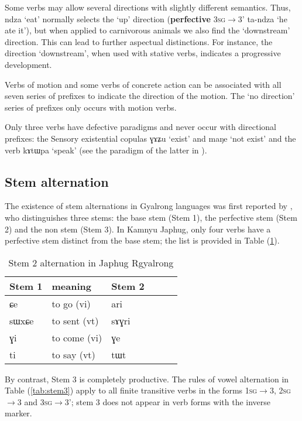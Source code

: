 \documentclass[oldfontcommands,oneside,a4paper,11pt]{article}
\newcommand{\ipa}[1]{{\phon \mbox{#1}}} %
\newcommand{\refb}[1]{(\ref{#1})}
\begin{document}
Some verbs may allow several directions with slightly different semantics. Thus, \ipa{ndza} `eat'   normally   selects the  `up' direction (\textbf{perfective} \textsc{3sg$\rightarrow$3'} \ipa{ta-ndza} `he ate it'), but when applied to carnivorous animals we also find the `downstream' direction. This can lead to further aspectual distinctions. For instance, the direction `downstream', when used with stative verbs, indicates a progressive development. 

Verbs of motion and some verbs of concrete action can be associated with all seven series of prefixes to indicate the direction of the motion. The  `no direction' series of prefixes only occurs with motion verbs. 

Only three verbs have defective paradigms and never occur with directional prefixes: the Sensory existential copulas \ipa{ɣɤʑu} `exist' and \ipa{maŋe} `not exist' and the verb \ipa{kɤtɯpa} `speak' (see the paradigm of the latter in \citealt[1215]{jacques12incorp}).

\subsection{Stem alternation} \label{sec:stem}
The existence of stem alternations in Gyalrong languages was first reported by \citet{jackson00puxi}, who distinguishes three stems: the base stem (Stem 1), the perfective stem (Stem 2) and the non stem (Stem 3). In Kamnyu Japhug, only four verbs have a perfective stem distinct from the base stem; the list is provided in Table \refb{tab:stem2}. 


 \begin{table}[H]
\caption{Stem 2 alternation in Japhug Rgyalrong} \label{tab:stem2} \centering
\begin{tabular}{llllll}
\toprule
Stem 1 & meaning &Stem 2 \\
\midrule
\ipa{ɕe}& to go (vi)&  \ipa{ari} \\
\ipa{sɯxɕe}& to sent (vt)  &\ipa{sɤɣri} \\
\ipa{ɣi}& to come (vi)  &\ipa{ɣe} \\
\ipa{ti}& to say (vt)  &\ipa{tɯt} \\
\bottomrule
\end{tabular}
\end{table}

By contrast, Stem 3 is completely productive. The rules of vowel alternation in Table \refb{tab:stem3} apply to all finite transitive verbs in the forms \textsc{1sg}$\rightarrow$3, \textsc{2sg}$\rightarrow$3 and \textsc{3sg}$\rightarrow$3'; stem 3 does not appear in verb forms with the inverse marker.
\end{document}
